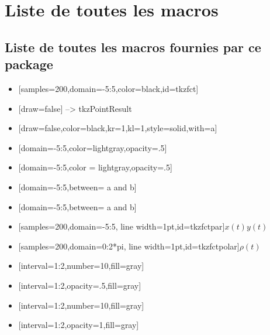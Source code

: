 \section{Liste de toutes les macros}

\subsection{Liste de toutes les macros fournies par ce package} 

\begin{itemize}
\item {}[samples=200,domain=-5:5,color=black,id=tkzfct]
\item {}[draw=false] --> tkzPointResult  
\item {}[draw=false,color=black,kr=1,kl=1,style=solid,with=a] 
\item {}[domain=-5:5,color=lightgray,opacity=.5]
\item {}[domain=-5:5,color = lightgray,opacity=.5]
\item {}[domain=-5:5,between= a and b]
\item {}[domain=-5:5,between= a and b]                                                
\item {}[samples=200,domain=-5:5,
                             line width=1pt,id=tkzfctpar]{$x(t)$}{$y(t)$}
\item {}[samples=200,domain=0:2*pi,
                             line width=1pt,id=tkzfctpolar]{$\rho(t)$} 
\item {}[interval=1:2,number=10,fill=gray]
\item {} [interval=1:2,opacity=.5,fill=gray]  
\item {} [interval=1:2,number=10,fill=gray]  
\item {}[interval=1:2,opacity=1,fill=gray]  
\end{itemize}  

